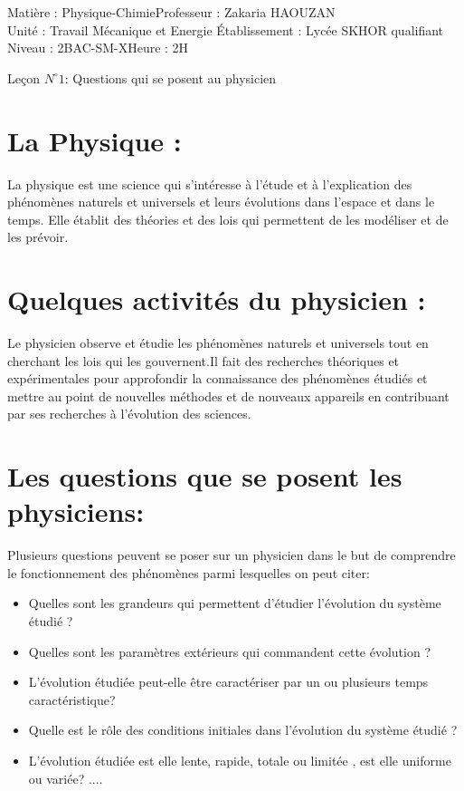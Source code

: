 \documentclass[12pt]{article}
\author{Zakaria HAOUZAN}
\date{\today}
\newcommand\headerMe[2]{\noindent{}#1\hfill#2}
\begin{document}
\headerMe{Matière : Physique-Chimie}{Professeur : Zakaria HAOUZAN}\\
\headerMe{Unité : Travail Mécanique et Energie }{Établissement : Lycée SKHOR qualifiant}\\
\headerMe{Niveau : 2BAC-SM-X}{Heure : 2H}\\

\begin{center}

    \Large{Leçon $N^{\circ} 1 $: \color{red}Questions qui se posent au physicien  }
\end{center}

\section{ La Physique :}
La physique est une science qui s'intéresse à l'étude et à l'explication des phénomènes naturels et universels et leurs
évolutions dans l'espace et dans le temps. Elle établit des théories et des lois qui permettent
de les modéliser et de les prévoir.

\section{ Quelques activités du physicien : }

Le physicien observe et étudie les phénomènes naturels et universels tout en cherchant les lois qui les gouvernent.Il
fait des recherches théoriques et expérimentales pour approfondir la connaissance des phénomènes étudiés et mettre
au point de nouvelles méthodes et de nouveaux appareils en contribuant par ses recherches à l'évolution des sciences.

\section{Les questions que se posent les physiciens: }
Plusieurs questions peuvent se poser sur un physicien dans le but de comprendre le fonctionnement des phénomènes
parmi lesquelles on peut citer:
\begin{itemize}
   \item Quelles sont les grandeurs qui permettent d'étudier l'évolution du système étudié ?
   \item Quelles sont les paramètres extérieurs qui commandent cette évolution ?
   \item L'évolution étudiée peut-elle être caractériser par un ou plusieurs temps caractéristique?
   \item Quelle est le rôle des conditions initiales dans l'évolution du système étudié ?
   \item L'évolution étudiée est elle lente, rapide, totale ou limitée , est elle uniforme ou variée? ....

\end{itemize}
\end{document}
